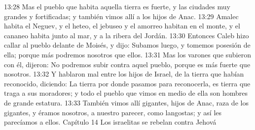 13:28 Mas el pueblo que habita aquella tierra es fuerte, y las ciudades muy grandes y fortificadas; y también vimos allí a los hijos de Anac.  
13:29 Amalec habita el Neguev, y el heteo, el jebuseo y el amorreo habitan en el monte, y el cananeo habita junto al mar, y a la ribera del Jordán.  
13:30 Entonces Caleb hizo callar al pueblo delante de Moisés, y dijo: Subamos luego, y tomemos posesión de ella; porque más podremos nosotros que ellos.  
13:31 Mas los varones que subieron con él, dijeron: No podremos subir contra aquel pueblo, porque es más fuerte que nosotros.  
13:32 Y hablaron mal entre los hijos de Israel, de la tierra que habían reconocido, diciendo: La tierra por donde pasamos para reconocerla, es tierra que traga a sus moradores; y todo el pueblo que vimos en medio de ella son hombres de grande estatura.  
13:33 También vimos allí gigantes, hijos de Anac, raza de los gigantes, y éramos nosotros, a nuestro parecer, como langostas; y así les parecíamos a ellos.  
Capítulo 14 
Los israelitas se rebelan contra Jehová  

